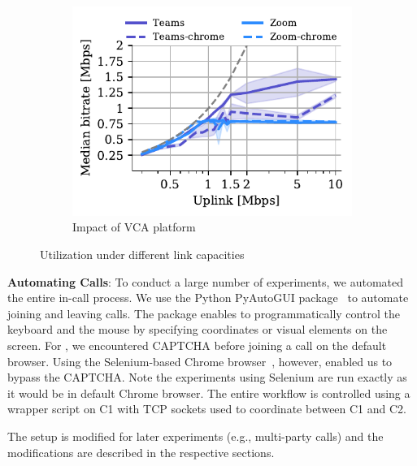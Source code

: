 \begin{figure}[ht!]
\begin{subfigure}[t]{0.33\textwidth}
\centering
    \includegraphics[width=\textwidth,keepaspectratio]{figures/static/uplink_browser.pdf}
    \caption{Impact of VCA platform}
	\label{subfig:uplink_browser}
\end{subfigure} 
\caption{Utilization under different link capacities}
\label{fig:static}
\end{figure}

\textbf{Automating Calls}: To conduct a large number of experiments, we automated the entire in-call process. %
We use the Python PyAutoGUI package~\cite{pyautogui} to automate joining and leaving calls. The package enables to programmatically control the keyboard and the mouse by specifying coordinates or visual elements on the screen. For \zoombrowser, we encountered CAPTCHA before joining a call on the default browser. Using the Selenium-based Chrome browser~\cite{selenium}, however, enabled us to bypass the CAPTCHA. Note the experiments using Selenium are run exactly as it would be in default Chrome browser. The entire workflow is controlled using a wrapper script on C1 with TCP sockets used to coordinate between C1 and C2. 





The setup is modified for later experiments (e.g., multi-party calls) and the modifications are described in the respective sections.


